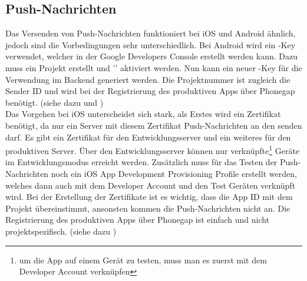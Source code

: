 \subsection{Push-Nachrichten}
Das Versenden von Push-Nachrichten funktioniert bei iOS und Android ähnlich, jedoch sind die Vorbedingungen sehr unterschiedlich. Bei Android wird ein -Key verwendet, welcher in der Google Developers Console erstellt werden kann. Dazu muss ein Projekt erstellt und '' aktiviert werden. Nun kann ein neuer -Key für die Verwendung im Backend generiert werden. Die Projektnummer ist zugleich die Sender ID und wird bei der Registrierung des produktiven Apps über Phonegap benötigt. (siehe dazu \cite{android_push_android} und \cite{devgirl_push_android})\\

Das Vorgehen bei iOS unterscheidet sich stark, als Erstes wird ein Zertifikat benötigt, da nur ein Server mit diesem Zertifikat Push-Nachrichten an den  senden darf. Es gibt ein Zertifikat für den Entwicklungsserver und ein weiteres für den produktiven Server. Über den Entwicklungsserver können nur verknüpfte\footnote{um die App auf einem Gerät zu testen, muss man es zuerst mit dem Developer Account verknüpfen} Geräte im Entwicklungsmodus erreicht werden. Zusätzlich muss für das Testen der Push-Nachrichten noch ein iOS App Development Provisioning Profile erstellt werden, welches dann auch mit dem Developer Account und den Test Geräten verknüpft wird. Bei der Erstellung der Zertifikate ist es wichtig, dass die App ID mit dem Projekt übereinstimmt, ansonsten kommen die Push-Nachrichten nicht an. Die Registrierung des produktiven Apps über Phonegap ist einfach und nicht projektspezifisch. (siehe dazu \cite{ios_push})\\

